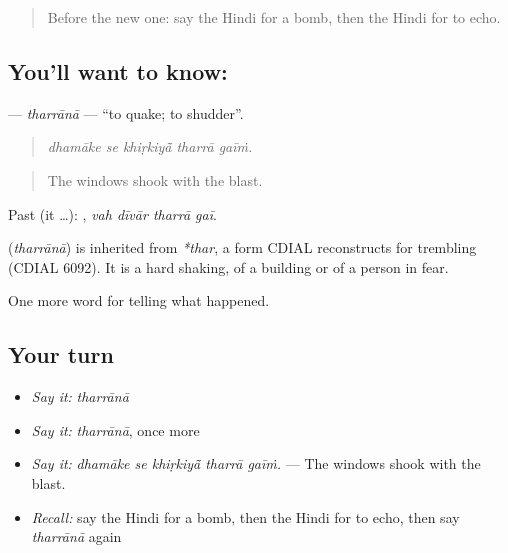 \label{lesson:HI-C318-tharrana}



\begin{quote}
Before the new one: say the Hindi for a bomb, then the Hindi for to echo.
\end{quote}

\subsection*{You'll want to know: }
\textbf{} — \emph{tharrānā} — \textquotedblleft{}to quake; to shudder\textquotedblright{}.

\begin{quote}
    
\end{quote}

\begin{quote}
\emph{dhamāke se khiṛkiyā̃ tharrā gaīṁ.}
\end{quote}

\begin{quote}
The windows shook with the blast.
\end{quote}

Past (it …):    , \emph{vah dīvār tharrā gaī}.

\begin{cousinweb}
\textbf{} (\emph{tharrānā}) is inherited from \emph{*thar}, a form CDIAL reconstructs for trembling (CDIAL 6092). It is a hard shaking, of a building or of a person in fear.
\end{cousinweb}

\begin{grammarlens}[title={What you've built}]
One more word for telling what happened.
\end{grammarlens}

\subsection*{Your turn}
\begin{itemize}
\raggedright
  \item \emph{Say it:} \emph{tharrānā}
  \item \emph{Say it:} \emph{tharrānā}, once more
  \item \emph{Say it:} \emph{dhamāke se khiṛkiyā̃ tharrā gaīṁ.} — The windows shook with the blast.
  \item \emph{Recall:} say the Hindi for a bomb, then the Hindi for to echo, then say \emph{tharrānā} again
\end{itemize}

